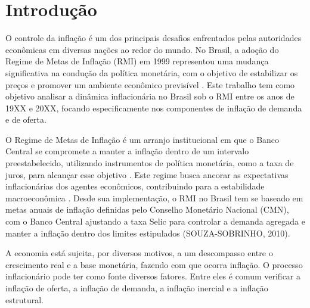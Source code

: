 \documentclass[12pt,oneside,a4paper,chapter=TITLE,english,brazil,sumario=abnt-6027-2012]{abntex2}
\begin{document}
\chapter{Introdução}


O controle da inflação é um dos principais desafios enfrentados pelas autoridades econômicas em diversas nações ao redor do mundo. No Brasil, a adoção do Regime de Metas de Inflação (RMI) em 1999 representou uma mudança significativa na condução da política monetária, com o objetivo de estabilizar os preços e promover um ambiente econômico previsível \cite{fraga_2003_inflation}. Este trabalho tem como objetivo analisar a dinâmica inflacionária no Brasil sob o RMI entre os anos de 19XX e 20XX, focando especificamente nos componentes de inflação de demanda e de oferta.

O Regime de Metas de Inflação é um arranjo institucional em que o Banco Central se compromete a manter a inflação dentro de um intervalo preestabelecido, utilizando instrumentos de política monetária, como a taxa de juros, para alcançar esse objetivo \cite{svensson_1997_inflation}. Este regime busca ancorar as expectativas inflacionárias dos agentes econômicos, contribuindo para a estabilidade macroeconômica \cite{mishkin_2000_inflation}. Desde sua implementação, o RMI no Brasil tem se baseado em metas anuais de inflação definidas pelo Conselho Monetário Nacional (CMN), com o Banco Central ajustando a taxa Selic para controlar a demanda agregada e manter a inflação dentro dos limites estipulados (SOUZA-SOBRINHO, 2010).

A economia está sujeita, por diversos motivos, a um descompasso entre o crescimento real e a base monetária, fazendo com que ocorra inflação. O processo inflacionário pode ter como fonte diversos fatores. Entre eles é comum verificar a inflação de oferta, a inflação de demanda, a inflação inercial e a inflação estrutural.
\end{document}
